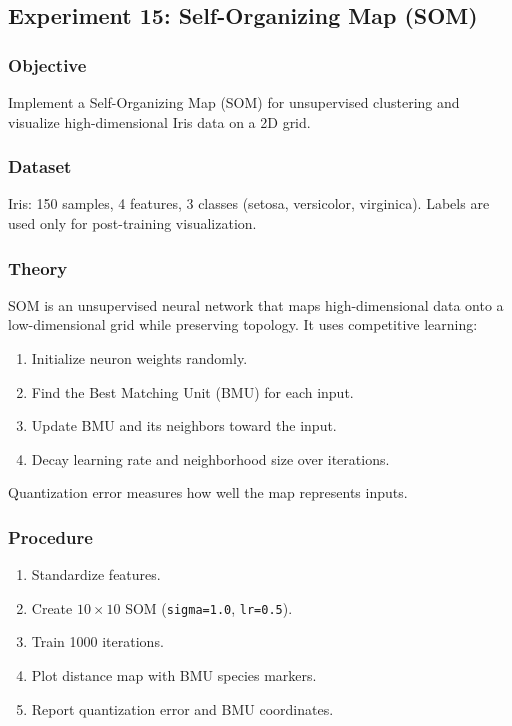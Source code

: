 \documentclass[a4paper,10pt]{article}
\begin{document}
\subsection{Experiment 15: Self-Organizing Map (SOM)}

\subsubsection{Objective}
Implement a Self-Organizing Map (SOM) for unsupervised clustering and visualize high-dimensional Iris data on a 2D grid.

\subsubsection{Dataset}
Iris: 150 samples, 4 features, 3 classes (setosa, versicolor, virginica). Labels are used only for post-training visualization.

\subsubsection{Theory}
SOM is an unsupervised neural network that maps high-dimensional data onto a low-dimensional grid while preserving topology. It uses competitive learning:
\begin{enumerate}[nosep]
    \item Initialize neuron weights randomly.
    \item Find the Best Matching Unit (BMU) for each input.
    \item Update BMU and its neighbors toward the input.
    \item Decay learning rate and neighborhood size over iterations.
\end{enumerate}
Quantization error measures how well the map represents inputs.

\subsubsection{Procedure}
\begin{enumerate}[nosep]
    \item Standardize features.
    \item Create \(10\times10\) SOM (\texttt{sigma=1.0}, \texttt{lr=0.5}).
    \item Train 1000 iterations.
    \item Plot distance map with BMU species markers.
    \item Report quantization error and BMU coordinates.
\end{enumerate}
\end{document}
